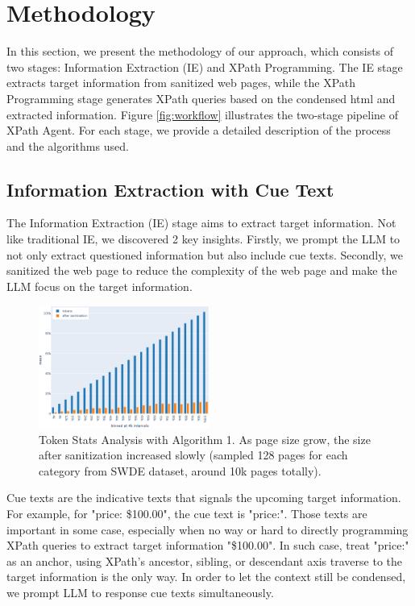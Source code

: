 \documentclass[a4paper]{article}
\begin{document}
\section{Methodology}

In this section, we present the methodology of our approach, which consists of two stages: Information Extraction (IE) and XPath Programming. The IE stage extracts target information from sanitized web pages, while the XPath Programming stage generates XPath queries based on the condensed html and extracted information. Figure \ref{fig:workflow} illustrates the two-stage pipeline of XPath Agent. For each stage, we provide a detailed description of the process and the algorithms used.

\subsection{Information Extraction with Cue Text}

The Information Extraction (IE) stage aims to extract target information. Not like traditional IE, we discovered 2 key insights. Firstly, we prompt the LLM to not only extract questioned information but also include cue texts. Secondly, we sanitized the web page to reduce the complexity of the web page and make the LLM focus on the target information.

\begin{figure}[h]
  \centering
  \includegraphics[width=0.5\textwidth]{./ie_token_stats.eps}
  \caption{Token Stats Analysis with Algorithm 1. As page size grow, the size after sanitization increased slowly (sampled 128 pages for each category from SWDE dataset, around 10k pages totally).}
  \label{fig:ie_token_stats}
\end{figure}

Cue texts are the indicative texts that signals the upcoming target information. For example, for "price: \$100.00", the cue text is "price:". Those texts are important in some case, especially when no way or hard to directly programming XPath queries to extract target information "\$100.00". In such case, treat "price:" as an anchor, using XPath's ancestor, sibling, or descendant axis traverse to the target information is the only way. In order to let the context still be condensed, we prompt LLM to response cue texts simultaneously.
\end{document}
